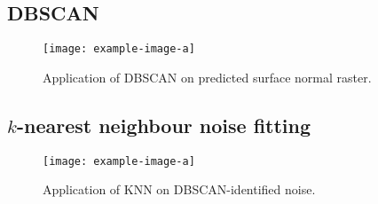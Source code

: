 \subsection{DBSCAN}

\begin{figure}[H]
  \centering
  \texttt{[image: example-image-a]}
  \caption{Application of DBSCAN on predicted surface normal raster.}
\end{figure}

\subsection{\texorpdfstring{$k$}{k}-nearest neighbour noise fitting}

\begin{figure}[H]
  \centering
  \texttt{[image: example-image-a]}
  \caption{Application of KNN on DBSCAN-identified noise.}
\end{figure}
